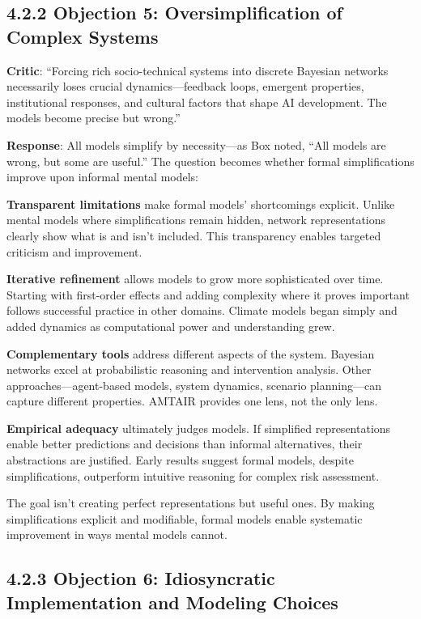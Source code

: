 \documentclass[
  11pt,
  letterpaper,
  openany]{book}
\begin{document}
\subsection{4.2.2 Objection 5: Oversimplification of Complex
Systems}\label{sec-oversimplification}

\textbf{Critic}: ``Forcing rich socio-technical systems into discrete
Bayesian networks necessarily loses crucial dynamics---feedback loops,
emergent properties, institutional responses, and cultural factors that
shape AI development. The models become precise but wrong.''

\textbf{Response}: All models simplify by necessity---as Box noted,
``All models are wrong, but some are useful.'' The question becomes
whether formal simplifications improve upon informal mental models:

\textbf{Transparent limitations} make formal models' shortcomings
explicit. Unlike mental models where simplifications remain hidden,
network representations clearly show what is and isn't included. This
transparency enables targeted criticism and improvement.

\textbf{Iterative refinement} allows models to grow more sophisticated
over time. Starting with first-order effects and adding complexity where
it proves important follows successful practice in other domains.
Climate models began simply and added dynamics as computational power
and understanding grew.

\textbf{Complementary tools} address different aspects of the system.
Bayesian networks excel at probabilistic reasoning and intervention
analysis. Other approaches---agent-based models, system dynamics,
scenario planning---can capture different properties. AMTAIR provides
one lens, not the only lens.

\textbf{Empirical adequacy} ultimately judges models. If simplified
representations enable better predictions and decisions than informal
alternatives, their abstractions are justified. Early results suggest
formal models, despite simplifications, outperform intuitive reasoning
for complex risk assessment.

The goal isn't creating perfect representations but useful ones. By
making simplifications explicit and modifiable, formal models enable
systematic improvement in ways mental models cannot.

\subsection{4.2.3 Objection 6: Idiosyncratic Implementation and Modeling
Choices}\label{sec-idiosyncratic}
\end{document}
